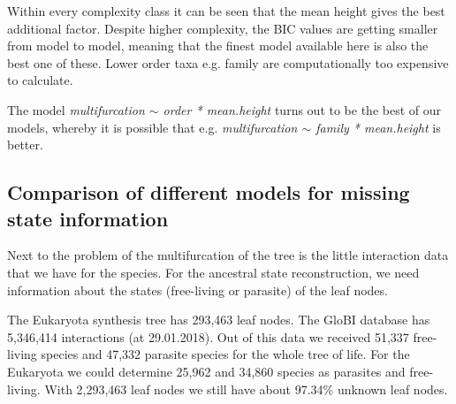       Within every complexity class it can be seen that the mean height gives the best additional factor.
        Despite higher complexity, the BIC values are getting smaller from model to model, meaning that 
        the finest model available here is also the best one of these. Lower order taxa e.g. family are 
        computationally too expensive to calculate.

      The model \textit{multifurcation $\sim$ order * mean.height} turns out to be the best of our models, 
        whereby it is possible that e.g. \textit{multifurcation $\sim$ family * mean.height} is better. \\

    \subsection{Comparison of different models for missing state information}
      Next to the problem of the multifurcation of the tree is the little interaction data that we have 
        for the species. For the ancestral state reconstruction, we need information about the states 
        (free-living or parasite) of the leaf nodes.
        
      The Eukaryota synthesis tree has 293,463 leaf nodes. The GloBI database has 5,346,414 interactions 
        (at 29.01.2018). Out of this data we received 51,337 free-living species and 47,332 parasite 
        species for the whole tree of life. For the Eukaryota we could determine 25,962 and 34,860 
        species as parasites and free-living. With 2,293,463 leaf nodes we still have about 97.34\% 
        unknown leaf nodes.
      
